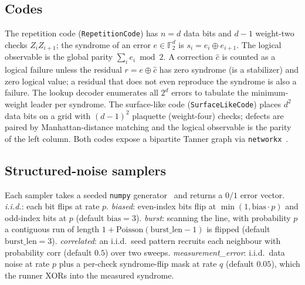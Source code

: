 \documentclass[reprint,aps,prxquantum,amsmath,amssymb,floatfix,nofootinbib,longbibliography]{revtex4-2}
\theoremstyle{definition}
\theoremstyle{remark}
\theoremstyle{plain}
\newcommand{\F}{\mathbb{F}}
\begin{document}
\subsection{Codes}
\label{sec:methods_codes}
The repetition code (\texttt{RepetitionCode}) has $n=d$ data bits and $d-1$ weight-two checks $Z_iZ_{i+1}$; the syndrome of an error $e\in\F_2^d$ is $s_i=e_i\oplus e_{i+1}$. The logical observable is the global parity $\sum_i e_i \bmod 2$. A correction $\hat c$ is counted as a logical failure unless the residual $r=e\oplus\hat c$ has zero syndrome (is a stabilizer) and zero logical value; a residual that does not even reproduce the syndrome is also a failure. The lookup decoder enumerates all $2^d$ errors to tabulate the minimum-weight leader per syndrome. The surface-like code (\texttt{SurfaceLikeCode}) places $d^2$ data bits on a grid with $(d-1)^2$ plaquette (weight-four) checks; defects are paired by Manhattan-distance matching and the logical observable is the parity of the left column. Both codes expose a bipartite Tanner graph via \texttt{networkx}~\cite{hagberg2008exploring}.

\subsection{Structured-noise samplers}
\label{sec:methods_noise}
Each sampler takes a seeded \texttt{numpy} generator~\cite{harris2020array} and returns a $0/1$ error vector. \emph{i.i.d.}: each bit flips at rate $p$. \emph{biased}: even-index bits flip at $\min(1,\mathrm{bias}\cdot p)$ and odd-index bits at $p$ (default $\mathrm{bias}=3$). \emph{burst}: scanning the line, with probability $p$ a contiguous run of length $1+\mathrm{Poisson}(\mathrm{burst\_len}-1)$ is flipped (default $\mathrm{burst\_len}=3$). \emph{correlated}: an i.i.d.\ seed pattern recruits each neighbour with probability $\mathrm{corr}$ (default $0.5$) over two sweeps. \emph{measurement\_error}: i.i.d.\ data noise at rate $p$ plus a per-check syndrome-flip mask at rate $q$ (default $0.05$), which the runner XORs into the measured syndrome.
\end{document}

